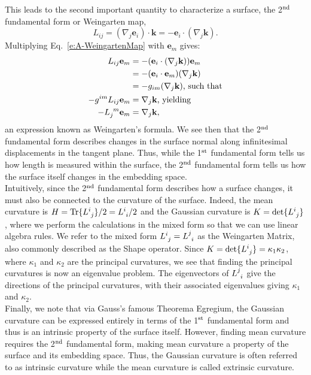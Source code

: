 \begin{appendices}
This leads to the second important quantity to characterize a surface, the 2$^{\rm nd}$ fundamental form or Weingarten map,
\begin{equation}
  L_{ij} = (\nabla_j \mathbf{e}_i) \cdot \mathbf{k} = -\mathbf{e}_i \cdot (\nabla_j \mathbf{k}).\label{e:A-WeingartenMap}
\end{equation}
Multiplying Eq.~\ref{e:A-WeingartenMap} with $\mathbf{e}_m$ gives:
\begin{align}
  L_{ij}\mathbf{e}_m &= -(\mathbf{e}_i \cdot (\nabla_j \mathbf{k}))\mathbf{e}_m \nonumber \\
  &= -(\mathbf{e}_i \cdot \mathbf{e}_m)(\nabla_j \mathbf{k})\nonumber \\
  &= -g_{im}(\nabla_j \mathbf{k})\textrm{, such that} \nonumber \\
  -g^{im}L_{ij}\mathbf{e}_m &= \nabla_j \mathbf{k}\textrm{, yielding} \nonumber \\
  -\tensor{L}{_j^m}\mathbf{e}_m &= \nabla_j \mathbf{k},\label{e:A-WeingartenFormula}
\end{align}
an expression known as Weingarten's formula.
We see then that the 2$^{\rm nd}$ fundamental form describes changes in the surface normal along infinitesimal displacements in the tangent plane.
Thus, while the 1$^{\rm st}$ fundamental form tells us how length is measured within the surface, the 2$^{\rm nd}$ fundamental form tells us how the surface itself changes in the embedding space. \\

Intuitively, since the 2$^{\rm nd}$ fundamental form describes how a surface changes, it must also be connected to the curvature of the surface.
Indeed, the mean curvature is $H = \textrm{Tr}\{ \tensor{L}{^i_j} \}/2 = \tensor{L}{^i_i}/2$ and the Gaussian curvature is $K = \textrm{det}\{ \tensor{L}{^i_j} \}$, where we perform the calculations in the mixed form so that we can use linear algebra rules.
We refer to the mixed form  $\tensor{L}{^i_j} = \tensor{L}{^j_i}$ as the Weingarten Matrix, also commonly described as the Shape operator.
Since $K = \textrm{det}\{ \tensor{L}{^i_j} \} = \kappa_1 \kappa_2$, where $\kappa_1$ and $\kappa_2$ are the principal curvatures, we see that finding the principal curvatures is now an eigenvalue problem.
The eigenvectors of $\tensor{L}{^j_i}$ give the directions of the principal curvatures, with their associated eigenvalues giving $\kappa_1$ and $\kappa_2$. \\

Finally, we note that via Gauss's famous Theorema Egregium, the Gaussian curvature can be expressed entirely in terms of the 1$^{\rm st}$ fundamental form and thus is an intrinsic property of the surface itself.
However, finding mean curvature requires the 2$^{\rm nd}$ fundamental form, making mean curvature a property of the surface and its embedding space.
Thus, the Gaussian curvature is often referred to as intrinsic curvature while the mean curvature is called extrinsic curvature.




\end{appendices}
